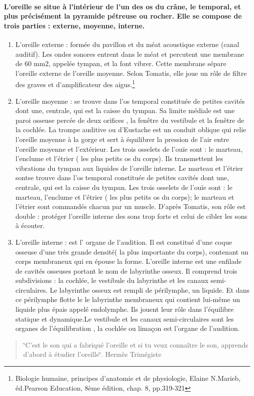 \paragraph{L'oreille se situe à l'intérieur de l'un des os du crâne, le temporal,
et plus précisément la pyramide pétreuse ou rocher. Elle se compose
de trois parties : externe, moyenne, interne.}
\begin{enumerate}
\item L'oreille externe : formée du pavillon et du méat acoustique externe
(canal auditif). Les ondes sonores entrent dans le méat et percutent
une membrane de 60 mm2, appelée tympan, et la font vibrer. Cette membrane
sépare l'oreille externe de l'oreille moyenne. Selon Tomatis, elle
joue un rôle de filtre des graves et d'amplificateur des aigus.\footnote{Biologie humaine, principes d'anatomie et de physiologie, Elaine N.Marieb,
éd.Pearson Education, 8ème édition, chap. 8, pp.319-321}
\item L'oreille moyenne : se trouve dans l'os temporal constituée de petites
cavités dont une, centrale, qui est la caisse du tympan. Sa limite
médiale est une paroi osseuse percée de deux orifices , la fenêtre
du vestibule et la fenêtre de la cochlée. La trompe auditive ou d'Eustache
est un conduit oblique qui relie l'oreille moyenne à la gorge et sert
à équilibrer la pression de l'air entre l'oreille moyenne et l'extérieur.
Les trois osselets de l'ouïe sont : le marteau, l'enclume et l'étrier
( les plus petits os du corps). Ils transmettent les vibrations du
tympan aux liquides de l'oreille interne. Le marteau et l'étrier sontse
trouve dans l'os temporal constituée de petites cavités dont une,
centrale, qui est la caisse du tympan. Les trois osselets de l'ouïe
sont : le marteau, l'enclume et l'étrier ( les plus petits os du corps);
le marteau et l'étrier sont commandés chacun par un muscle. D'après
Tomatis, son rôle est double : protéger l'oreille interne des sons
trop forts et celui de cibler les sons à écouter.
\item L'oreille interne : est l' organe de l\textquoteright audition. Il
est constitué d'une coque osseuse d'une très grande densité( la plus
importante du corps), contenant un corps membraneux qui en épouse
la forme. L'oreille interne est une enfilade de cavités osseuses portant
le nom de labyrinthe osseux. Il comprend trois subdivisions : la cochlée,
le vestibule du labyrinthe et les canaux semi-circulaires. Le labyrinthe
osseux est rempli de périlymphe, un liquide. Et dans ce périlymphe
flotte le le labyrinthe membraneux qui contient lui-même un liquide
plus épais appelé endolymphe. Ils jouent leur rôle dans l'équilibre
statique et dynamique.Le vestibule et les canaux semi-circulaires
sont les organes de l\textquoteright équilibration , la cochlée ou
limaçon est l'organe de l'audition. 
\end{enumerate}
\begin{quotation}
\char`\"{}C'est le son qui a fabriqué l'oreille et si tu veux connaître
le son, apprends d'abord à étudier l\textquoteright oreille\char`\"{}.
Hermès Trimégiste
\end{quotation}

